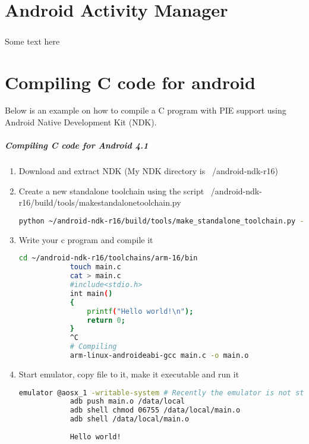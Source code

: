 \documentclass[../main.tex]{subfile}
\begin{document}
	\appendix
		\chapter{Android Activity Manager}
		\label{app::android_am}
			\paragraph{} Some text here
		
		\chapter{Compiling C code for android}
		Below is an example on how to compile a C program with PIE support using Android Native Development Kit (NDK).
		\paragraph{Compiling C code for Android 4.1}
		\begin{enumerate}
			\item Download and extract NDK (My NDK directory is ~/android-ndk-r16)
			\item Create a new standalone toolchain using the script ~/android-ndk-r16/build/tools/make\textunderscore standalone\textunderscore toolchain.py
			\begin{lstlisting}[language=bash, numbers=none]
				python ~/android-ndk-r16/build/tools/make_standalone_toolchain.py --arch arm --api 16 --install-dir ~/android-ndk-r16/toolchains/arm-16
			\end{lstlisting}
			\item Write your c program and compile it
			\begin{lstlisting}[language=bash]
			cd ~/android-ndk-r16/toolchains/arm-16/bin
			touch main.c
			cat > main.c
			#include<stdio.h>
			int main()
			{
				printf("Hello world!\n");
				return 0;
			}
			^C
			# Compiling
			arm-linux-androideabi-gcc main.c -o main.o
			\end{lstlisting}
			
			\item Start emulator, copy file to it, make it executable and run it
			
			\begin{lstlisting}[language=bash]
			emulator @aosx_1 -writable-system # Recently the emulator is not starting without writable, check if yours do
			adb push main.o /data/local
			adb shell chmod 06755 /data/local/main.o
			adb shell /data/local/main.o
			
			Hello world!
			\end{lstlisting}
		\end{enumerate}		
\end{document}
